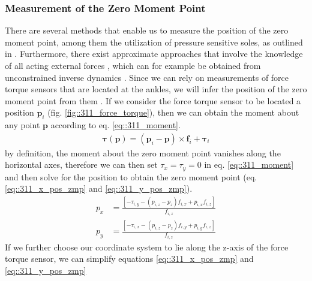 \subsubsection{Measurement of the Zero Moment Point}
There are several methods that enable us to measure the position of the zero moment point, among them the utilization of pressure sensitive soles, as outlined in \cite{kajita2014introduction}. Furthermore, there exist approximate approaches that involve the knowledge of all acting external forces \cite{huang2001planning}, which can for example be obtained from unconstrained inverse dynamics \cite{michel2017dynamic}. Since we can rely on measurements of force torque sensors that are located at the ankles, we will infer the position of the zero moment point from them \cite{kajita2014introduction}. If we consider the force torque sensor to be located a position $\bm{p}_i$ (fig. \ref{fig::311_force_torque}), then we can obtain the moment about any point $\bm{p}$ according to eq. \ref{eq::311_moment}.
\begin{align}
	\bm{\tau}(\bm{p}) = (\bm{p}_i-\bm{p})\times \bm{f}_i + \bm{\tau}_i
	\label{eq::311_moment}
\end{align}
by definition, the moment about the zero moment point vanishes along the horizontal axes, therefore we can then set $\tau_x = \tau_y = 0$ in eq. \ref{eq::311_moment} and then solve for the position to obtain the zero moment point (eq. \ref{eq::311_x_pos_zmp} and \ref{eq::311_y_pos_zmp}).
\begin{align}
	p_x &= \frac{\left[-\tau_{i,y}-(p_{i,z}-p_z)f_{i,x}+p_{i,x}f_{i,z}\right]}{f_{i,z}}
	\label{eq::311_x_pos_zmp}\\
	p_y &= \frac{\left[-\tau_{i,x}-(p_{i,z}-p_z)f_{i,y}+p_{i,y}f_{i,z}\right]}{f_{i,z}}
	\label{eq::311_y_pos_zmp}
\end{align}
If we further choose our coordinate system to lie along the z-axis of the force torque sensor, we can simplify equations \ref{eq::311_x_pos_zmp} and \ref{eq::311_y_pos_zmp} 